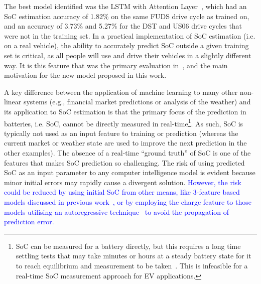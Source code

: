 The best model identified was the LSTM with Attention Layer~\cite{mamo_long_2020}, which had an SoC estimation accuracy of 1.82\% on the same FUDS drive cycle as trained on, and an accuracy of 3.73\% and 5.27\% for the DST and US06 drive cycles that were not in the training set.
In a practical implementation of SoC estimation (i.e. on a real vehicle), the ability to accurately predict SoC outside a given training set is critical, as all people will use and drive their vehicles in a slightly different way.
It is this feature that was the primary evaluation in~\cite{sadykov_practical_2022}, and the main motivation for the new model proposed in this work.

%
%
A key difference between the application of machine learning to many other non-linear systems (e.g., financial market predictions or analysis of the weather) and its application to SoC estimation is that the primary focus of the prediction in batteries, i.e. SoC, cannot be directly measured in real-time\footnote{SoC can be measured for a battery directly, but this requires a long time settling tests that may take minutes or hours at a steady battery state for it to reach equilibrium and measurement to be taken~\cite{ali_towards_2019}. This is infeasible for a real-time SoC measurement approach for EV applications.}.
As such, SoC is typically not used as an input feature to training or prediction (whereas the current market or weather state are used to improve the next prediction in the other examples).
The absence of a real-time “ground truth” of SoC is one of the features that makes SoC prediction so challenging.
The risk of using predicted SoC as an input parameter to any computer intelligence model is evident because minor initial errors may rapidly cause a divergent solution.
\textcolor{blue}{However, the risk could be reduced by using initial SoC from other means, like 3-feature based models discussed in previous work~\cite{sadykov_practical_2022}, or by employing the charge feature to those models utilising an autoregressive technique~\cite{time_2020} to avoid the propagation of prediction error.}

